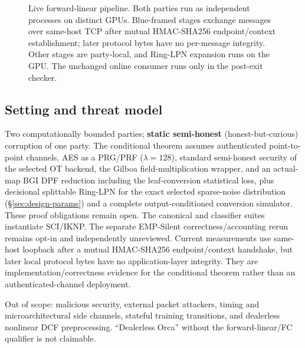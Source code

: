 \documentclass[11pt]{article}
\begin{document}
\begin{figure}[t]
\caption{Live forward-linear pipeline. Both parties run as independent
processes on distinct GPUs. Blue-framed stages exchange messages over same-host
TCP after mutual HMAC-SHA256 endpoint/context establishment; later protocol
bytes have no per-message integrity. Other stages are party-local, and
Ring-LPN expansion runs on the GPU. The unchanged online consumer runs only in
the post-exit checker.}
\label{fig:pipeline}
\end{figure}

\subsection{Setting and threat model}
\label{sec:threat}

Two computationally bounded parties; \textbf{static semi-honest}
(honest-but-curious) corruption of one party. The conditional theorem assumes
authenticated point-to-point channels, AES as a PRG/PRF
($\lambda{=}128$), standard semi-honest security of the selected OT backend,
the Gilboa field-multiplication wrapper, and an actual-map BGI DPF reduction
including the leaf-conversion statistical loss, plus decisional
splittable Ring-LPN for the exact selected sparse-noise distribution
(\S\ref{sec:design-params}) and a complete output-conditioned conversion
simulator. These proof obligations remain open. The canonical and classifier suites instantiate
SCI/IKNP. The separate EMP-Silent correctness/accounting rerun remains opt-in
and independently unreviewed. Current measurements use same-host loopback after
a mutual HMAC-SHA256 endpoint/context handshake, but later local protocol bytes
have no application-layer integrity. They are implementation/correctness
evidence for the conditional theorem rather than an authenticated-channel
deployment.

Out of scope: malicious security, external packet attackers, timing and
microarchitectural side channels, stateful training transitions, and
dealerless nonlinear DCF preprocessing. ``Dealerless Orca'' without the
forward-linear/FC qualifier is not claimable.
\end{document}
